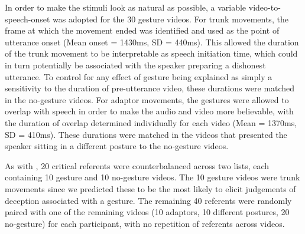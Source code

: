 \documentclass[a4paper,man,natbib]{apa6}
\begin{document}

In order to make the stimuli look as natural as possible, a variable video-to-speech-onset was adopted for the 30 gesture videos.
For trunk movements, the frame at which the movement ended was identified and used as the point of utterance onset (Mean onset = 1430ms, SD = 440ms).
This allowed the duration of the trunk movement to be interpretable as speech initiation time, which could in turn potentially be associated with the speaker preparing a dishonest utterance.
To control for any effect of gesture being explained as simply a sensitivity to the duration of pre-utterance video, these durations were matched in the no-gesture videos.
For adaptor movements, the gestures were allowed to overlap with speech in order to make the audio and video more believable, with the duration of overlap determined individually for each video (Mean = 1370ms, SD = 410ms).
These durations were matched in the videos that presented the speaker sitting in a different posture to the no-gesture videos.

As with \citep{Loy2017}, 20 critical referents were counterbalanced across two lists, each containing 10 gesture and 10 no-gesture videos.
The 10 gesture videos were trunk movements since we predicted these to be the most likely to elicit judgements of deception associated with a gesture. %
The remaining 40 referents were randomly paired with one of the remaining videos (10 adaptors, 10 different postures, 20 no-gesture) for each participant, with no repetition of referents across videos.
\end{document}
